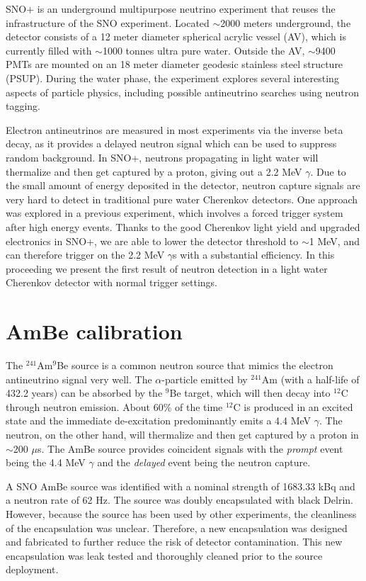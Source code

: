 \documentclass[a4paper]{jpconf}
\begin{document}
SNO+\cite{Andringa:2015tza} is an underground multipurpose neutrino experiment that reuses the infrastructure of the SNO experiment. Located $\sim$2000 meters underground, the detector consists of a 12 meter diameter spherical acrylic vessel (AV), which is currently filled with $\sim$1000 tonnes ultra pure water. Outside the AV, $\sim$9400 PMTs are mounted on an 18 meter diameter geodesic stainless steel structure (PSUP). During the water phase, the experiment explores several interesting aspects of particle physics, including possible antineutrino searches using neutron tagging.

Electron antineutrinos are measured in most experiments via the inverse beta decay, as it provides a delayed neutron signal which can be used to suppress random background. In SNO+, neutrons propagating in light water will thermalize and then get captured by a proton, giving out a 2.2 MeV $\gamma$. Due to the small amount of energy deposited in the detector, neutron capture signals are very hard to detect in traditional pure water Cherenkov detectors. One approach\cite{Watanabe:2008ru} was explored in a previous experiment, which involves a forced trigger system after high energy events. Thanks to the good Cherenkov light yield and upgraded electronics in SNO+, we are able to lower the detector threshold to $\sim$1 MeV, and can therefore trigger on the 2.2 MeV $\gamma$s with a substantial efficiency. In this proceeding we present the first result of neutron detection in a light water Cherenkov detector with normal trigger settings. 


\section{AmBe calibration}


The $^{241}$Am$^{9}$Be source is a common neutron source that mimics the electron antineutrino signal very well. The $\alpha$-particle emitted by $^{241}$Am (with a half-life of 432.2 years) can be absorbed by the $^{9}$Be target, which will then decay into $^{12}$C through neutron emission. About 60\% of the time $^{12}$C is produced in an excited state and the immediate de-excitation predominantly emits a 4.4 MeV $\gamma$. The neutron, on the other hand, will thermalize and then get captured by a proton in $\sim$200 $\mu$s. The AmBe source provides coincident signals with the \textit{prompt} event being the 4.4 MeV $\gamma$ and the \textit{delayed} event being the neutron capture.

A SNO AmBe source was identified with a nominal strength of 1683.33 kBq and a neutron rate of 62 Hz\cite{jloach2009:diss}. The source was doubly encapsulated with black Delrin. However, because the source has been used by other experiments, the cleanliness of the encapsulation was unclear. Therefore, a new encapsulation was designed and fabricated to further reduce the risk of detector contamination. This new encapsulation was leak tested and thoroughly cleaned prior to the source deployment.
\end{document}
